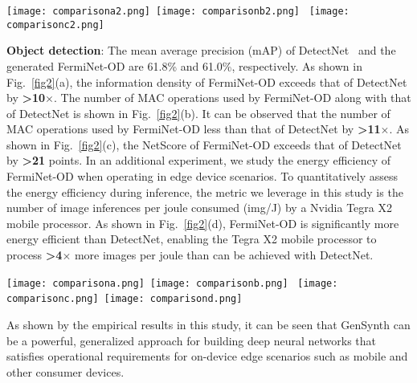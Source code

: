 \documentclass{article}
\begin{document}
\begin{figure*}[t]
	\hspace{-0.2in}\texttt{[image: comparisona2.png]}~\texttt{[image: comparisonb2.png]}~
\texttt{[image: comparisonc2.png]}
\vspace{-0.2in}
	\caption{Semantic segmentation: (a) Information density, (b) MAC operations, and (c) NetScore.}
\vspace{-0.26in}
	\label{fig3}
\end{figure*}

\textbf{Object detection}: The mean average precision (mAP) of DetectNet~\cite{DetectNet} and the generated FermiNet-OD are 61.8\% and 61.0\%, respectively.  As shown in Fig.~\ref{fig2}(a), the information density of FermiNet-OD exceeds that of DetectNet by \textbf{>10$\times$}.  The number of MAC operations used by FermiNet-OD along with that of DetectNet is shown in Fig.~\ref{fig2}(b).  It can be observed that the number of MAC operations used by FermiNet-OD less than that of DetectNet by \textbf{>11$\times$}.  As shown in Fig.~\ref{fig2}(c), the NetScore of FermiNet-OD exceeds that of DetectNet by \textbf{>21} points.  In an additional experiment, we study the energy efficiency of FermiNet-OD when operating in edge device scenarios.  To quantitatively assess the energy efficiency during inference, the metric we leverage in this study is the number of image inferences per joule consumed (img/J) by a Nvidia Tegra X2 mobile processor.  As shown in Fig.~\ref{fig2}(d), FermiNet-OD is significantly more energy efficient than DetectNet, enabling the Tegra X2 mobile processor to process \textbf{>4$\times$} more images per joule than can be achieved with DetectNet.

\begin{figure*}[t]
	\hspace{-0.7in}\texttt{[image: comparisona.png]}~\texttt{[image: comparisonb.png]}~
\texttt{[image: comparisonc.png]}~\texttt{[image: comparisond.png]}
\vspace{-0.15in}
	\caption{Object detection: (a) Information density, (b) MAC operations, (c) NetScore, and (d) energy efficiency on the Nvidia Tegra X2 mobile processor.}
\vspace{-0.23in}
	\label{fig2}
\end{figure*}

As shown by the empirical results in this study, it can be seen that GenSynth can be a powerful, generalized approach for building deep neural networks that satisfies operational requirements for on-device edge scenarios such as mobile and other consumer devices.
\vspace{-0.1in}
\end{document}

